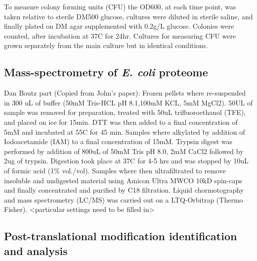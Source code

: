 \documentclass[12pt]{article}
\begin{document}
To measure colony forming units (CFU) the OD600, at each time point, was taken relative to sterile DM500 glucose, cultures were diluted in sterile saline, and finally plated on DM agar supplemented with 0.2g/L glucose. Colonies were counted, after incubation at 37C for 24hr. Cultures for measuring CFU were grown separately from the main culture but in identical conditions. 

\subsection{Mass-spectrometry of \emph{E. coli} proteome} 
Dan Boutz part (Copied from John’s paper):
Frozen pellets where re-suspended in 300 uL of buffer (50mM Tris-HCL pH 8.1,100mM KCL, 5mM MgCl2). 50UL of sample was removed for preparation, treated with 50uL trifluoroethanol (TFE), and placed on ice for 15min. DTT was then added to a final concentration of 5mM and incubated at 55C for 45 min. Samples where alkylated by addition of Iodoacetamide (IAM) to a final concentration of 15mM. Trypsin digest was performed by addition of 800uL of 50mM Tris pH 8.0, 2mM CaCl2 followed by 2ug of trypsin. Digestion took place at 37C for 4-5 hrs and was stopped by 10uL of formic acid (1\% vol./vol). Samples where then ultrafiltrated to remove insoluble and undigested material using Amicon Ultra MWCO 10kD spin-caps and finally concentrated and purified by C18 filtration. 
Liquid chormotography and mass spectrometry (LC/MS) was carried out on a LTQ-Orbitrap (Thermo Fisher). <particular settings need to be filled in>

\subsection{Post-translational modification identification and analysis} 
\end{document}
